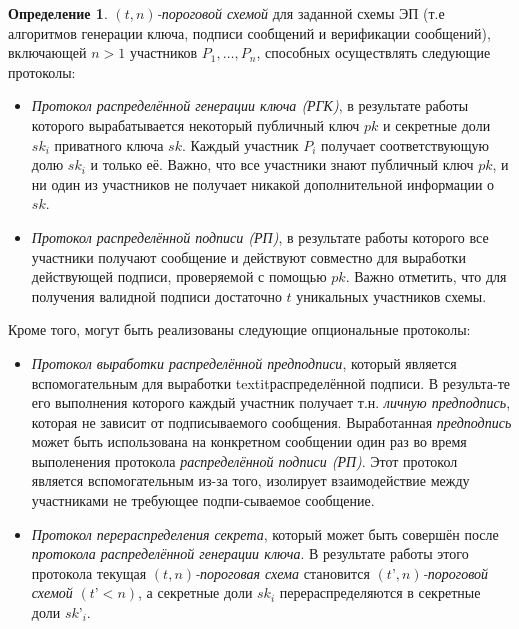 \documentclass[a4paper,12pt]{article}
\theoremstyle{definition}
\newtheorem{defn}{Определение}
\begin{document}
	\begin{defn}\label{def:Tscheme}
	\textit{$(t, n)$-пороговой схемой} для заданной схемы ЭП (т.е алгоритмов генерации ключа, подписи сообщений и верификации сообщений), включающей $n > 1$ участников $P_1, \dots, P_n$, способных осуществлять следующие протоколы:
	\begin{itemize}
		\item \label{def:Tkeygen} \textit{Протокол распределённой генерации ключа (РГК)}, в результате работы которого вырабатывается некоторый публичный ключ $pk$ и секретные доли $sk_i$ приватного ключа $sk$. Каждый участник $P_i$ получает соответствующую долю $sk_i$ и только её. Важно, что все участники знают публичный ключ $pk$, и ни один из участников не получает никакой дополнительной информации о $sk$.
		\item \label{def:Tsign} \textit{Протокол распределённой подписи (РП)}, в результате работы которого все участники получают сообщение и действуют совместно для выработки действующей подписи, проверяемой с помощью $pk$. Важно отметить, что для получения валидной подписи достаточно $t$ уникальных участников схемы.
	\end{itemize}

	Кроме того, могут быть реализованы следующие опциональные протоколы:

	\begin{itemize}
		\item \label{def:Tpredsign} \textit{Протокол выработки распределённой предподписи}, который является вспомогательным для выработки textit{распределённой подписи}. В результа-те его выполнения которого каждый участник получает т.н. \textit{личную предподпись}, которая не зависит от подписываемого сообщения. Выработанная \textit{предподпись} может быть использована на конкретном сообщении один раз во время выполенения протокола \textit{распределённой подписи (РП)}. Этот протокол является вспомогательным из-за того, изолирует взаимодействие между участниками не требующее подпи-сываемое сообщение.
		\item \label{def:Tredisp} \textit{Протокол перераспределения секрета}, который может быть совершён после \textit{протокола распределённой генерации ключа}. В результате работы этого протокола текущая \textit{$(t, n)$-пороговая схема} становится \textit{$(t’, n)$-пороговой схемой} $\left(t’ < n\right)$, а секретные доли $sk_i$ перераспределяются в секретные доли $sk’_i$.	
	\end{itemize}
	\end{defn}
	
\end{document}
